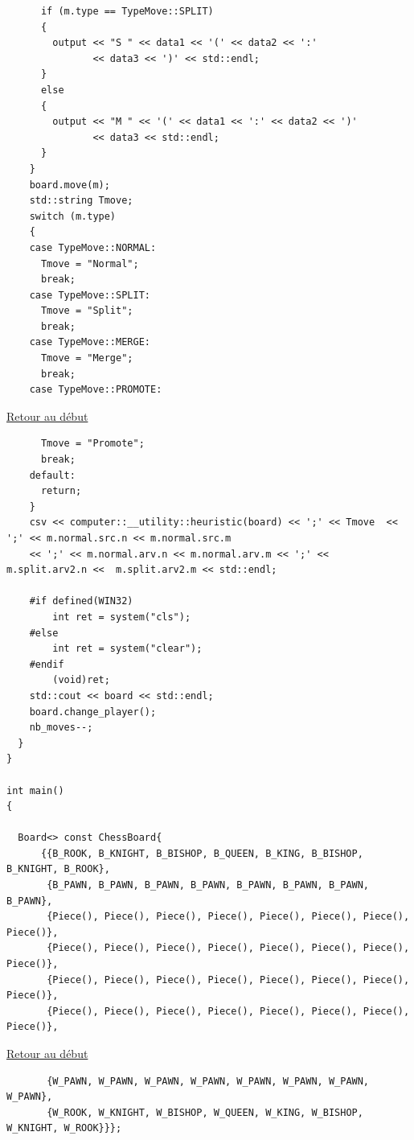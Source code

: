 {\begin{frame}[fragile]
\begin{verbatim}
      if (m.type == TypeMove::SPLIT)
      {
        output << "S " << data1 << '(' << data2 << ':'
               << data3 << ')' << std::endl;
      }
      else
      {
        output << "M " << '(' << data1 << ':' << data2 << ')'
               << data3 << std::endl;
      }
    }
    board.move(m);
    std::string Tmove;
    switch (m.type)
    {
    case TypeMove::NORMAL:
      Tmove = "Normal";
      break;
    case TypeMove::SPLIT:
      Tmove = "Split";
      break;
    case TypeMove::MERGE:
      Tmove = "Merge";
      break;
    case TypeMove::PROMOTE:
\end{verbatim}
\end{frame}

\begin{frame}[fragile]
\hyperlink{conclusion}{Retour au début}\newline
\begin{verbatim}
      Tmove = "Promote";
      break;
    default:
      return;
    }
    csv << computer::__utility::heuristic(board) << ';' << Tmove  << ';' << m.normal.src.n << m.normal.src.m
    << ';' << m.normal.arv.n << m.normal.arv.m << ';' <<  m.split.arv2.n <<  m.split.arv2.m << std::endl;
    
    #if defined(WIN32)
        int ret = system("cls");
    #else
        int ret = system("clear");
    #endif
        (void)ret;
    std::cout << board << std::endl;
    board.change_player();
    nb_moves--;
  }
}

int main()
{

  Board<> const ChessBoard{
      {{B_ROOK, B_KNIGHT, B_BISHOP, B_QUEEN, B_KING, B_BISHOP, B_KNIGHT, B_ROOK},
       {B_PAWN, B_PAWN, B_PAWN, B_PAWN, B_PAWN, B_PAWN, B_PAWN, B_PAWN},
       {Piece(), Piece(), Piece(), Piece(), Piece(), Piece(), Piece(), Piece()},
       {Piece(), Piece(), Piece(), Piece(), Piece(), Piece(), Piece(), Piece()},
       {Piece(), Piece(), Piece(), Piece(), Piece(), Piece(), Piece(), Piece()},
       {Piece(), Piece(), Piece(), Piece(), Piece(), Piece(), Piece(), Piece()},
\end{verbatim}
\end{frame}

\begin{frame}[fragile]
\hyperlink{conclusion}{Retour au début}\newline
\begin{verbatim}
       {W_PAWN, W_PAWN, W_PAWN, W_PAWN, W_PAWN, W_PAWN, W_PAWN, W_PAWN},
       {W_ROOK, W_KNIGHT, W_BISHOP, W_QUEEN, W_KING, W_BISHOP, W_KNIGHT, W_ROOK}}};


\end{verbatim}
\end{frame}}
